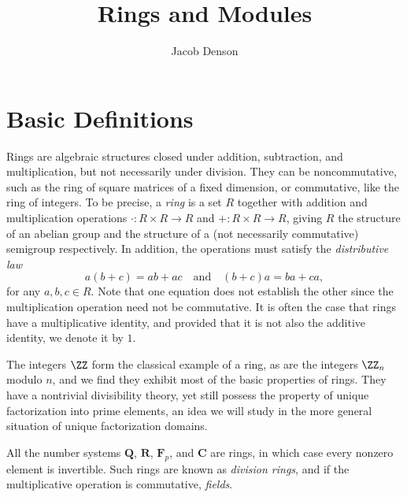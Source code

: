 

\title{Rings and Modules}
\author{Jacob Denson}



\maketitle
\tableofcontents

\chapter{Basic Definitions}


Rings are algebraic structures closed under addition, subtraction, and multiplication, but not necessarily under division. They can be noncommutative, such as the ring of square matrices of a fixed dimension, or commutative, like the ring of integers. To be precise, a \emph{ring} is a set $R$ together with addition and multiplication operations $\cdot: R \times R \to R$ and $+: R \times R \to R$, giving $R$ the structure of an abelian group and the structure of a (not necessarily commutative) semigroup respectively. In addition, the operations must satisfy the \emph{distributive law}
%
\[ a(b + c) = ab + ac \quad\text{and}\quad (b + c)a = ba + ca, \]
%
for any $a,b,c \in R$. Note that one equation does not establish the other since the multiplication operation need not be commutative. It is often the case that rings have a multiplicative identity, and provided that it is not also the additive identity, we denote it by $1$.

\begin{example}
    The integers $\ZZ$ form the classical example of a ring, as are the integers $\ZZ_n$ modulo $n$, and we find they exhibit most of the basic properties of rings. They have a nontrivial divisibility theory, yet still possess the property of unique factorization into prime elements, an idea we will study in the more general situation of unique factorization domains.
\end{example}

\begin{example}
    All the number systems $\mathbf{Q}$, $\mathbf{R}$, $\mathbf{F}_p$, and $\mathbf{C}$ are rings, in which case every nonzero element is invertible. Such rings are known as \emph{division rings}, and if the multiplicative operation is commutative, \emph{fields}.
\end{example}

